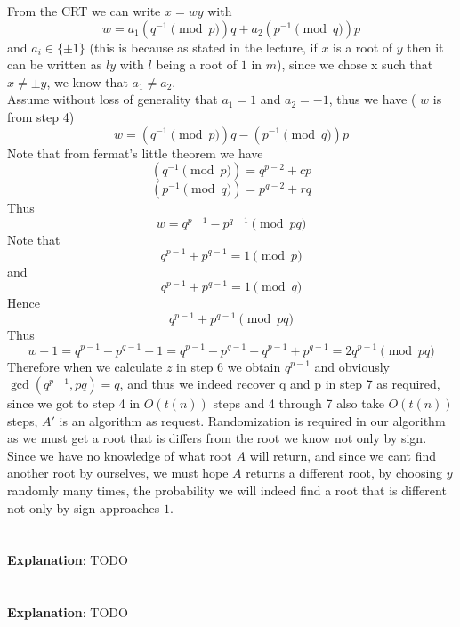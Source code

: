 \documentclass{article}
\begin{document}
From the CRT we can write $x = wy$ with 
\[w = a_1(q^{-1} \pmod p)q + a_2(p^{-1} \pmod q)p\]
and $a_i \in \{\pm 1\}$ (this is because as stated in the lecture, if $x$ is a root of $y$ then it can be written as $ly$ with $l$ being a root of $1$ in $m$), since we chose x such that $x \neq \pm y$, we know that $a_1 \neq a_2$.\\
Assume without loss of generality that $a_1 = 1$ and  $a_2 = -1$, thus we have ( $w$ is from step 4)
\[w = (q^{-1} \pmod p)q - (p^{-1} \pmod q)p \]
Note that from fermat's little theorem we have 
\[(q^{-1} \pmod p)= q^{p-2} + cp\]
\[(p^{-1} \pmod q)= p^{q-2} + rq\]
Thus 
\[w = q^{p-1} - p^{q-1} \pmod {pq}\]
Note that 
\[q^{p-1} + p^{q-1} = 1 \pmod p\]
and
\[q^{p-1} + p^{q-1}  = 1 \pmod q\]
Hence
\[q^{p-1} + p^{q-1} \pmod {pq}\]
Thus
\[w + 1 = q^{p-1} - p^{q-1} + 1  = q^{p-1} - p^{q-1} + q^{p-1} + p^{q-1} = 2q^{p-1} \pmod {pq}\]
Therefore when we calculate $z$ in step 6 we obtain $q^{p-1}$ and obviously $\gcd(q^{p-1}, pq) = q$, and thus we indeed recover q and p in step 7 as required, since we got to step 4 in $O(t(n))$ steps and 4 through 7 also take $O(t(n))$ steps, $A'$ is an algorithm as request.
Randomization is required in our algorithm as we must get a root that is differs from the root we know not only by sign. Since we have no knowledge of what root $A$ will return, and since we cant find another root by ourselves, we must hope $A$ returns a different root, by choosing $y$ randomly many times, the probability we will indeed find a root that is different not only by sign approaches $1$.
 

\section{} %


\textbf{Explanation}: TODO
\subsection{} %
\subsection{} %

\section{} %


\textbf{Explanation}: TODO
\end{document}
